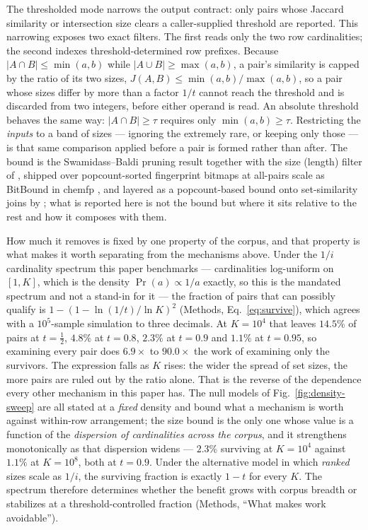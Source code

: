 \label{note:threshold}

The thresholded mode narrows the output contract: only pairs whose Jaccard similarity or intersection
size clears a caller-supplied threshold are reported. This narrowing exposes two exact filters. The
first reads only the two row cardinalities; the second indexes threshold-determined row prefixes.
Because $|A \cap B| \le \min(a,b)$ while $|A \cup B| \ge \max(a,b)$, a pair's
similarity is capped by the ratio of its two sizes, $J(A,B) \le \min(a,b)/\max(a,b)$, so a pair whose
sizes differ by more than a factor $1/t$ cannot reach the threshold and is discarded from two
integers, before either operand is read. An absolute threshold behaves the same way: $|A \cap B| \ge
\tau$ requires only $\min(a,b) \ge \tau$. Restricting the \emph{inputs} to a band of sizes --- ignoring
the extremely rare, or keeping only those --- is that same comparison applied before a pair is formed
rather than after. The bound is the Swamidass--Baldi pruning result \cite{swamidass2007bounds}
together with the size (length) filter of \cite{arasu2006exact}, shipped over popcount-sorted
fingerprint bitmaps at all-pairs scale as BitBound in chemfp \cite{dalke2019chemfp}, and layered as a
popcount-based bound onto set-similarity joins by \cite{sandes2020bitmapfilter};
what is reported here is not the bound but where it sits relative to the rest and how it composes with
them.

How much it removes is fixed by one property of the corpus, and that property is what makes it worth
separating from the mechanisms above. Under the $1/i$ cardinality spectrum this paper benchmarks ---
cardinalities log-uniform on $[1,K]$, which is the density $\Pr(a) \propto 1/a$ exactly, so this is the
mandated spectrum and not a stand-in for it --- the fraction of pairs that can possibly qualify is
$1 - (1 - \ln(1/t)/\ln K)^{2}$ (Methods, Eq.~\eqref{eq:survive}), which agrees with a $10^{5}$-sample
simulation to three decimals. At $K = 10^{4}$ that leaves $14.5\%$ of pairs at $t = \tfrac12$, $4.8\%$
at $t = 0.8$, $2.3\%$ at $t = 0.9$ and $1.1\%$ at $t = 0.95$, so examining every pair does $6.9\times$
to $90.0\times$ the work of examining only the survivors. The expression falls as $K$ rises:
the wider the spread of set sizes, the more pairs are ruled out by the ratio alone. That is the
reverse of the dependence every other mechanism in this paper has. The null models of
Fig.~\ref{fig:density-sweep} are all stated at a \emph{fixed} density and bound what a mechanism is
worth against within-row arrangement; the size bound is the only one whose value is a function of the
\emph{dispersion of cardinalities across the corpus}, and it strengthens monotonically as that
dispersion widens --- $2.3\%$ surviving at $K = 10^{4}$ against $1.1\%$ at $K = 10^{8}$, both at $t =
0.9$. Under the alternative model in which \emph{ranked} sizes scale as $1/i$, the surviving fraction
is exactly $1-t$ for every $K$. The spectrum therefore determines whether the benefit grows with
corpus breadth or stabilizes at a threshold-controlled fraction (Methods, ``What makes work
avoidable'').

